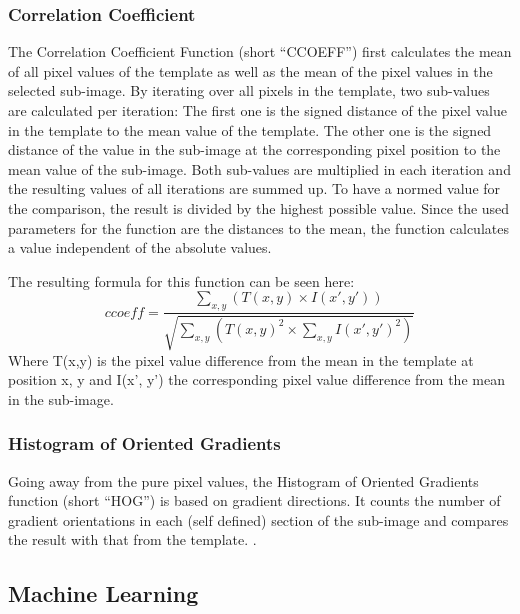 \subsubsection{Correlation Coefficient}
The Correlation Coefficient Function (short ``CCOEFF'') first calculates the mean of all pixel values of the template as well as the mean of the pixel values in the selected sub-image.
By iterating over all pixels in the template, two sub-values are calculated per iteration:
The first one is the signed distance of the pixel value in the template to the mean value of the template.
The other one is the signed distance of the value in the sub-image at the corresponding pixel position to the mean value of the sub-image.
Both sub-values are multiplied in each iteration and the resulting values of all iterations are summed up.
To have a normed value for the comparison, the result is divided by the highest possible value.
Since the used parameters for the function are the distances to the mean, the function calculates a value independent of the absolute values.

The resulting formula for this function can be seen here:
\[ccoeff = \frac{\sum_{x,y} (T(x,y) \times I(x',y'))}{\sqrt{\sum_{x,y} (T(x,y)^2 \times \sum_{x,y} I(x',y')^2)}} \]
Where T(x,y) is the pixel value difference from the mean in the template at position x, y and I(x', y') the corresponding pixel value difference from the mean in the sub-image.
\subsubsection{Histogram of Oriented Gradients}
Going away from the pure pixel values, the Histogram of Oriented Gradients function (short ``HOG'') is based on gradient directions.
It counts the number of gradient orientations in each (self defined) section of the sub-image and compares the result with that from the template.
\cite{hog_function}.

\subsection{Machine Learning}

